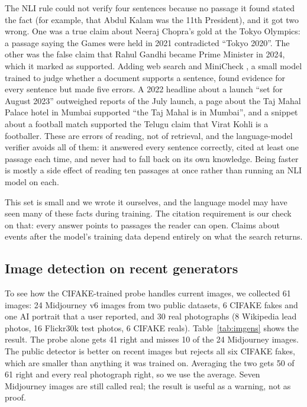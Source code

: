 \documentclass[conference]{IEEEtran}
\begin{document}
The NLI rule could not verify four sentences because no passage it found stated the fact (for example, that Abdul Kalam was the 11th President), and it got two wrong. One was a true claim about Neeraj Chopra's gold at the Tokyo Olympics: a passage saying the Games were held in 2021 contradicted ``Tokyo 2020''. The other was the false claim that Rahul Gandhi became Prime Minister in 2024, which it marked as supported. Adding web search and MiniCheck \cite{tang2024minicheck}, a small model trained to judge whether a document supports a sentence, found evidence for every sentence but made five errors. A 2022 headline about a launch ``set for August 2023'' outweighed reports of the July launch, a page about the Taj Mahal Palace hotel in Mumbai supported ``the Taj Mahal is in Mumbai'', and a snippet about a football match supported the Telugu claim that Virat Kohli is a footballer. These are errors of reading, not of retrieval, and the language-model verifier avoids all of them: it answered every sentence correctly, cited at least one passage each time, and never had to fall back on its own knowledge. Being faster is mostly a side effect of reading ten passages at once rather than running an NLI model on each.

This set is small and we wrote it ourselves, and the language model may have seen many of these facts during training. The citation requirement is our check on that: every answer points to passages the reader can open. Claims about events after the model's training data depend entirely on what the search returns.

\subsection{Image detection on recent generators}
\label{sec:imgres}
To see how the CIFAKE-trained probe handles current images, we collected 61 images: 24 Midjourney v6 images from two public datasets, 6 CIFAKE fakes and one AI portrait that a user reported, and 30 real photographs (8 Wikipedia lead photos, 16 Flickr30k test photos, 6 CIFAKE reals). Table~\ref{tab:imgens} shows the result. The probe alone gets 41 right and misses 10 of the 24 Midjourney images. The public detector is better on recent images but rejects all six CIFAKE fakes, which are smaller than anything it was trained on. Averaging the two gets 50 of 61 right and every real photograph right, so we use the average. Seven Midjourney images are still called real; the result is useful as a warning, not as proof.
\end{document}
